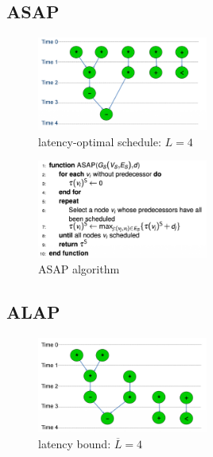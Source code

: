 \subsection{ASAP}
\begin{figure}[h]
	\begin{center}
		\includegraphics[width=0.5\textwidth]{images/ASAP_graph.png}
		\caption{latency-optimal schedule: $L = 4$}
		\label{fig:ASAP_graph}
	\end{center}
\end{figure}
\begin{figure}[h]
	\begin{center}
		\includegraphics[width=0.5\textwidth]{images/ASAP.png}
		\caption{ASAP algorithm}
		\label{fig:ASAP_algo}
	\end{center}
\end{figure}

\subsection{ALAP}
\begin{figure}[h]
	\begin{center}
		\includegraphics[width=0.5\textwidth]{images/ALAP_graph.png}
		\caption{latency bound: $\overline L = 4$}
		\label{fig:ALAP_graph}
	\end{center}
\end{figure}

